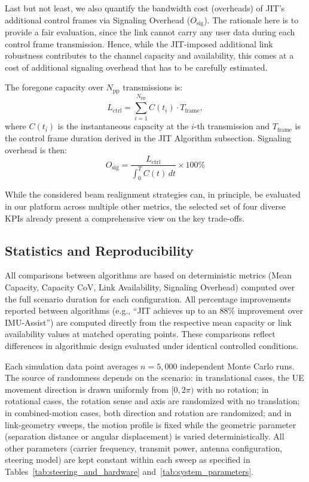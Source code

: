 \documentclass[fleqn,10pt]{wlscirep}
\begin{document}
Last but not least, we also quantify the bandwidth cost (overheads) of JIT's additional control frames via Signaling Overhead ($O_{\text{sig}}$). The rationale here is to provide a fair evaluation, since the link cannot carry any user data during each control frame transmission. Hence, while the JIT-imposed additional link robustness contributes to the channel capacity and availability, this comes at a cost of additional signaling overhead that has to be carefully estimated.

The foregone capacity over $N_{\text{pp}}$ transmissions is:
\begin{equation}
    L_{\text{ctrl}} = \sum_{i=1}^{N_{\text{pp}}} C(t_i) \cdot T_{\text{frame}},
\end{equation}
where $C(t_i)$ is the instantaneous capacity at the $i$-th transmission and $T_{\text{frame}}$ is the control frame duration derived in the JIT Algorithm subsection. Signaling overhead is then:
\begin{equation}
    O_{\text{sig}} = \frac{L_{\text{ctrl}}}{\int_{0}^{T} C(t) \, dt} \times 100\%
\end{equation}

While the considered beam realignment strategies can, in principle, be evaluated in our platform across multiple other metrics, the selected set of four diverse KPIs already present a comprehensive view on the key trade-offs.

\subsection*{Statistics and Reproducibility}
All comparisons between algorithms are based on deterministic metrics (Mean Capacity, Capacity CoV, Link Availability, Signaling Overhead) computed over the full scenario duration for each configuration. All percentage improvements reported between algorithms (e.g., ``JIT achieves up to an 88\% improvement over IMU-Assist'') are computed directly from the respective mean capacity or link availability values at matched operating points. These comparisons reflect differences in algorithmic design evaluated under identical controlled conditions.

Each simulation data point averages $n = 5{,}000$ independent Monte Carlo runs. The source of randomness depends on the scenario: in translational cases, the UE movement direction is drawn uniformly from $[0, 2\pi)$ with no rotation; in rotational cases, the rotation sense and axis are randomized with no translation; in combined-motion cases, both direction and rotation are randomized; and in link-geometry sweeps, the motion profile is fixed while the geometric parameter (separation distance or angular displacement) is varied deterministically. All other parameters (carrier frequency, transmit power, antenna configuration, steering model) are kept constant within each sweep as specified in Tables~\ref{tab:steering_and_hardware} and~\ref{tab:system_parameters}. 
\end{document}
